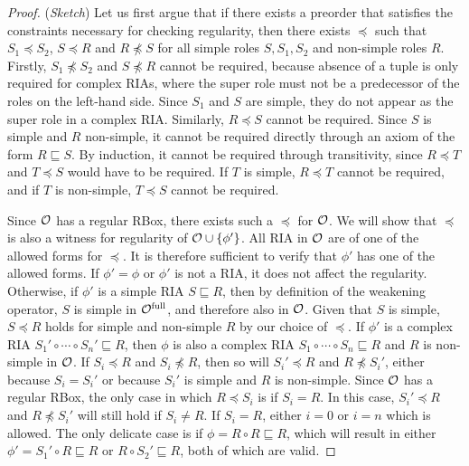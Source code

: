 \documentclass[
]{ceurart}
\begin{document}
\begin{proof}(\emph{Sketch}) \label{proof:regularity}
  Let us first argue that if there exists a preorder that satisfies the constraints necessary for checking regularity, then there exists $\preceq$ such that $S_1 \preceq S_2$, $S \preceq R$ and $R \not\preceq S$ for all simple roles $S, S_1, S_2$ and non-simple roles $R$. Firstly, $S_1 \not\preceq S_2$ and $S \not\preceq R$ cannot be required, because absence of a tuple is only required for complex RIAs, where the super role must not be a predecessor of the roles on the left-hand side. Since $S_1$ and $S$ are simple, they do not appear as the super role in a complex RIA. Similarly, $R \preceq S$ cannot be required. Since $S$ is simple and $R$ non-simple, it cannot be required directly through an axiom of the form $R \sqsubseteq S$. By induction, it cannot be required through transitivity, since $R \preceq T$ and $T \preceq S$ would have to be required. If $T$ is simple, $R \preceq T$ cannot be required, and if $T$ is non-simple, $T \preceq S$ cannot be required.

  Since $\mathcal{O}$ has a regular RBox, there exists such a $\preceq$ for $\mathcal{O}$. We will show that $\preceq$ is also a witness for regularity of $\mathcal{O} \cup \{ \phi' \}$. All RIA in $\mathcal{O}$ are of one of the allowed forms for $\preceq$. It is therefore sufficient to verify that $\phi'$ has one of the allowed forms.
  If $\phi' = \phi$ or $\phi'$ is not a RIA, it does not affect the regularity.
  Otherwise, if $\phi'$ is a simple RIA $S \sqsubseteq R$, then by definition of the weakening operator, $S$ is simple in ${\mathcal{O}^\textnormal{full}}$, and therefore also in $\mathcal{O}$. Given that $S$ is simple, $S \preceq R$ holds for simple and non-simple $R$ by our choice of $\preceq$.
  If $\phi'$ is a complex RIA $S_1' \circ \cdots \circ S_n' \sqsubseteq R$, then $\phi$ is also a complex RIA $S_1 \circ \cdots \circ S_n \sqsubseteq R$ and $R$ is non-simple in $\mathcal{O}$. If $S_i \preceq R$ and $S_i \not\preceq R$, then so will $S_i' \preceq R$ and $R \not\preceq S_i'$, either because $S_i = S_i'$ or because $S_i'$ is simple and $R$ is non-simple. Since $\mathcal{O}$ has a regular RBox, the only case in which $R \preceq S_i$ is if $S_i = R$. In this case, $S_i' \preceq R$ and $R \not\preceq S_i'$ will still hold if $S_i \not= R$. If $S_i = R$, either $i = 0$ or $i = n$ which is allowed. The only delicate case is if $\phi = R \circ R \sqsubseteq R$, which will result in either $\phi' = S_1' \circ R \sqsubseteq R$ or $R \circ S_2' \sqsubseteq R$, both of which are valid.
\end{proof}
\end{document}
